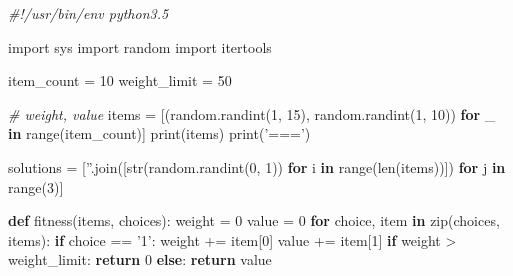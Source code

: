 \documentclass[11pt]{article}
\newenvironment{Shaded}{}{}
\newcommand{\KeywordTok}[1]{\textcolor[rgb]{0.00,0.44,0.13}{\textbf{{#1}}}}
\newcommand{\DecValTok}[1]{\textcolor[rgb]{0.25,0.63,0.44}{{#1}}}
\newcommand{\StringTok}[1]{\textcolor[rgb]{0.25,0.44,0.63}{{#1}}}
\newcommand{\CommentTok}[1]{\textcolor[rgb]{0.38,0.63,0.69}{\textit{{#1}}}}
\newcommand{\NormalTok}[1]{{#1}}
\newcommand{\ImportTok}[1]{{#1}}
\newcommand{\ControlFlowTok}[1]{\textcolor[rgb]{0.00,0.44,0.13}{\textbf{{#1}}}}
\newcommand{\OperatorTok}[1]{\textcolor[rgb]{0.40,0.40,0.40}{{#1}}}
\newcommand{\BuiltInTok}[1]{{#1}}
\begin{document}
\begin{Shaded}
\begin{Highlighting}[]
\CommentTok{#!/usr/bin/env python3.5}

\ImportTok{import} \NormalTok{sys}
\ImportTok{import} \NormalTok{random}
\ImportTok{import} \NormalTok{itertools}

\NormalTok{item_count }\OperatorTok{=} \DecValTok{10}
\NormalTok{weight_limit }\OperatorTok{=} \DecValTok{50}

\CommentTok{# weight, value}
\NormalTok{items }\OperatorTok{=} \NormalTok{[(random.randint(}\DecValTok{1}\NormalTok{, }\DecValTok{15}\NormalTok{), random.randint(}\DecValTok{1}\NormalTok{, }\DecValTok{10}\NormalTok{))}
         \ControlFlowTok{for} \NormalTok{_ }\KeywordTok{in} \BuiltInTok{range}\NormalTok{(item_count)]}
\BuiltInTok{print}\NormalTok{(items)}
\BuiltInTok{print}\NormalTok{(}\StringTok{'==='}\NormalTok{)}

\NormalTok{solutions }\OperatorTok{=} \NormalTok{[}\StringTok{''}\NormalTok{.join([}\BuiltInTok{str}\NormalTok{(random.randint(}\DecValTok{0}\NormalTok{, }\DecValTok{1}\NormalTok{))}
             \ControlFlowTok{for} \NormalTok{i }\KeywordTok{in} \BuiltInTok{range}\NormalTok{(}\BuiltInTok{len}\NormalTok{(items))])}
             \ControlFlowTok{for} \NormalTok{j }\KeywordTok{in} \BuiltInTok{range}\NormalTok{(}\DecValTok{3}\NormalTok{)]}

\KeywordTok{def} \NormalTok{fitness(items, choices):}
    \NormalTok{weight }\OperatorTok{=} \DecValTok{0}
    \NormalTok{value }\OperatorTok{=} \DecValTok{0}
    \ControlFlowTok{for} \NormalTok{choice, item }\KeywordTok{in} \BuiltInTok{zip}\NormalTok{(choices, items):}
        \ControlFlowTok{if} \NormalTok{choice }\OperatorTok{==} \StringTok{'1'}\NormalTok{:}
            \NormalTok{weight }\OperatorTok{+=} \NormalTok{item[}\DecValTok{0}\NormalTok{]}
            \NormalTok{value }\OperatorTok{+=} \NormalTok{item[}\DecValTok{1}\NormalTok{]}
    \ControlFlowTok{if} \NormalTok{weight }\OperatorTok{>} \NormalTok{weight_limit:}
        \ControlFlowTok{return} \DecValTok{0}
    \ControlFlowTok{else}\NormalTok{:}
        \ControlFlowTok{return} \NormalTok{value}


\end{Highlighting}
\end{Shaded}
\end{document}
